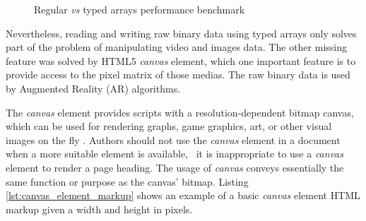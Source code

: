 \begin{figure}[!htb]
  \caption{Regular \textit{vs} typed arrays performance benchmark}
  \label{figure:typed_arrays_performance}
\end{figure}

Nevertheless, reading and writing raw binary data using typed arrays only solves part of the problem of manipulating video and images data. The other missing feature was solved by HTML5 \textit{canvas} element, which one important feature is to provide access to the pixel matrix of those medias. The raw binary data is used by Augmented Reality (AR) algorithms.

The \textit{canvas} element provides scripts with a resolution-dependent bitmap canvas, which can be used for rendering graphs, game graphics, art, or other visual images on the fly \cite{Canvas2013}. Authors should not use the \textit{canvas} element in a document when a more suitable element is available, \eg\ it is inappropriate to use a \textit{canvas} element to render a page heading. The usage of \textit{canvas} conveys essentially the same function or purpose as the canvas' bitmap. Listing \ref{lst:canvas_element_markup} shows an example of a basic \textit{canvas} element HTML markup given a width and height in pixels.


